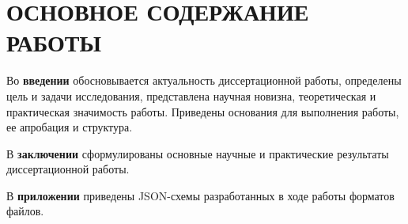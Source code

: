
\section*{ОСНОВНОЕ СОДЕРЖАНИЕ РАБОТЫ}
Во {\bf введении}
обосновывается актуальность диссертационной работы,
определены цель и задачи исследования,
представлена научная новизна, теоретическая и практическая значимость работы.
Приведены основания для выполнения работы, ее апробация и структура.







В {\bf заключении}
сформулированы основные научные и практические результаты
диссертационной работы.

В {\bf приложении}
приведены
JSON-схемы разработанных
в ходе работы форматов файлов.

